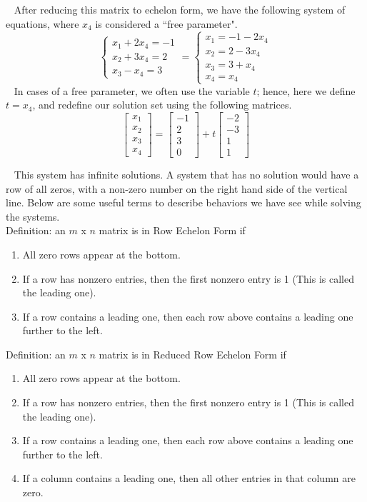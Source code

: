\documentclass[12pt]{article}
\begin{document}
$\,\,\,$ After reducing this matrix to echelon form, we have the following system of equations, where $x_4$ is considered a “free parameter".
$$\left\lbrace\begin{matrix}
x_1+2x_4=-1\\x_2+3x_4=2\\x_3-x_4=3
\end{matrix}\right.=\left\lbrace\begin{matrix}
x_1=-1-2x_4\\x_2=2-3x_4\\x_3=3+x_4\\x_4=x_4
\end{matrix}\right.$$
$\,\,\,$ In cases of a free parameter, we often use the variable $t$; hence, here we define $t=x_4$, and redefine our solution set using the following matrices.
$$\begin{bmatrix}
x_1\\x_2\\x_3\\x_4
\end{bmatrix}
=
\begin{bmatrix}
-1\\2\\3\\0
\end{bmatrix}
+t
\begin{bmatrix}
-2\\-3\\1\\1
\end{bmatrix}$$

$\,\,\,$ This system has infinite solutions. A system that has no solution would have a row of all zeros, with a non-zero number on the right hand side of the vertical line. Below are some useful terms to describe behaviors we have see while solving the systems.\\

Definition: an $m$ x $n$ matrix is in Row Echelon Form if

\begin{enumerate}
\item All zero rows appear at the bottom.
\item If a row has nonzero entries, then the first nonzero entry is 1 (This is called the leading one).
\item If a row contains a leading one, then each row above contains a leading one further to the left.
\end{enumerate}

Definition: an $m$ x $n$ matrix is in Reduced Row Echelon Form if

\begin{enumerate}
\item All zero rows appear at the bottom.
\item If a row has nonzero entries, then the first nonzero entry is 1 (This is called the leading one).
\item If a row contains a leading one, then each row above contains a leading one further to the left.
\item If a column contains a leading one, then all other entries in that column are zero.
\end{enumerate}
\end{document}
